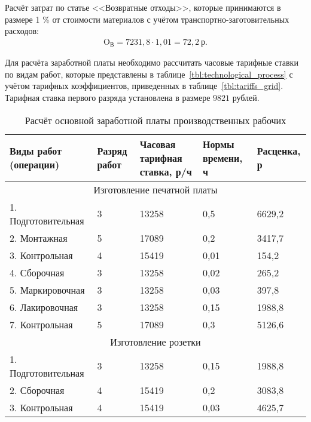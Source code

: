 Расчёт затрат по статье <<Возвратные отходы>>, которые принимаются в размере
1 \% от стоимости материалов с учётом транспортно-заготовительных расходов:
\begin{align}
  \text{O}_{\text{В}} = 7231{,}8 \cdot 1{,}01 = 72{,}2 \: \text{р.}  \nonumber
\end{align}

\newpage

Для расчёта заработной платы необходимо рассчитать часовые тарифные ставки по
видам работ, которые представлены в таблице~\ref{tbl:technological_process}
с учётом тарифных коэффициентов, приведенных в таблице~\ref{tbl:tariffs_grid}.
Тарифная ставка первого разряда установлена в размере $ 9821 $ рублей.

\begin{table}[h!]
  \caption{Расчёт основной заработной платы производственных рабочих}
  \label{tbl:technological_process_result}
  \centering
  \small{
    \begin{tabular}{| p{} | p{} | p{} |
                      p{} | p{} |}
      \hline
      Виды работ (операции) &
      Разряд работ &
      Часовая \newline тарифная \newline ставка, р/ч &
      Нормы \newline времени, ч &
      Расценка, р \\ \hline

      \multicolumn{5}{|c|}{Изготовление печатной платы} \\ \hline
      1. Подготовительная & 3 & 13258 & 0,5  & 6629,2  \\ \hline
      2. Монтажная        & 5 & 17089 & 0,2  & 3417,7  \\ \hline
      3. Контрольная      & 4 & 15419 & 0,01 & 154,2   \\ \hline
      4. Сборочная        & 3 & 13258 & 0,02 & 265,2   \\ \hline
      5. Маркировочная    & 3 & 13258 & 0,03 & 397,8   \\ \hline
      6. Лакировочная     & 3 & 13258 & 0,15 & 1988,8  \\ \hline
      7. Контрольная      & 5 & 17089 & 0,3  & 5126,6  \\ \hline

      \multicolumn{5}{|c|}{Изготовление розетки} \\ \hline
      1. Подготовительная & 3 & 13258 & 0,15 & 1988,8  \\ \hline
      2. Сборочная        & 4 & 15419 & 0,2  & 3083,8  \\ \hline
      3. Контрольная      & 4 & 15419 & 0,03 & 4625,7  \\ \hline


\end{tabular}}
\end{table}
